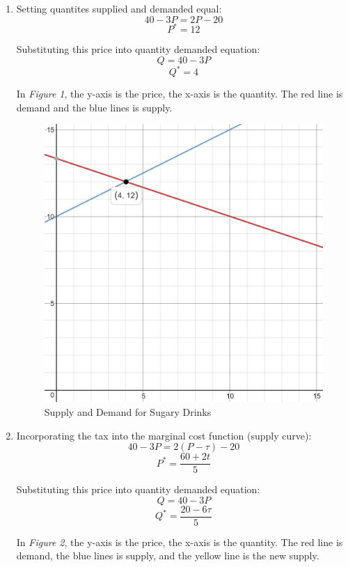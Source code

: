 \documentclass{article}
\begin{document}
\begin{enumerate}[1.]
    \item Setting quantites supplied and demanded equal:
        $$ 40 - 3P = 2P - 20 $$
        $$ P^{*} = 12 $$

        Substituting this price into quantity demanded equation:
        $$ Q = 40 - 3P $$
        $$ Q^{*} = 4 $$

        In \textit{Figure 1}, the y-axis is the price, the x-axis is the
        quantity. The red line is demand and the blue lines is supply.

        \begin{figure}[H]
            \centering
            \includegraphics[scale=0.5]{"Supply and Demand for Sugary Drinks"}
            \caption{Supply and Demand for Sugary Drinks}
        \end{figure}

    \item Incorporating the tax into the marginal cost function (supply curve):
        $$ 40 - 3P = 2 ( P - \tau ) - 20 $$
        $$ P^{*} = \frac{ 60 + 2t }{ 5 } $$

        Substituting this price into quantity demanded equation:
        $$ Q = 40 - 3P $$
        $$ Q^{*} = \frac{ 20 - 6 \tau }{ 5 } $$

        In \textit{Figure 2}, the y-axis is the price, the x-axis is the
        quantity. The red line is demand, the blue lines is supply, and the
        yellow line is the new supply.


\end{enumerate}
\end{document}
